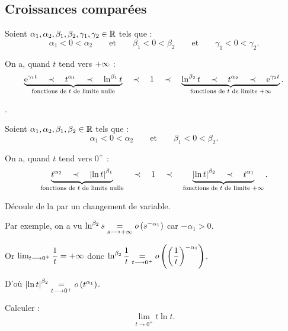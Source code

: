 \subsection{Croissances comparées}

\begin{prop}
Soient \(\alpha_1,\alpha_2,\beta_1,\beta_2,\gamma_1,\gamma_2\in\mathbb{R}\) tels que : \[\alpha_1<0<\alpha_2\qquad\text{et}\qquad\beta_1<0<\beta_2\qquad\text{et}\qquad\gamma_1<0<\gamma_2.\]

On a, quand \(t\) tend vers \(+\infty\) : \[\underbrace{\mathrm{e}^{\gamma_1t}\quad\prec\quad t^{\alpha_1}\quad\prec\quad\ln^{\beta_1}t}_{\text{fonctions de }t\text{ de limite nulle}}\quad\prec\quad1\quad\prec\quad\underbrace{\ln^{\beta_2}t\quad\prec\quad t^{\alpha_2}\quad\prec\quad\mathrm{e}^{\gamma_2t}}_{\text{fonctions de }t\text{ de limite }+\infty}.\]
\end{prop}

\begin{dem}
\Cf {}.
\end{dem}

\begin{prop}
Soient \(\alpha_1,\alpha_2,\beta_1,\beta_2\in\mathbb{R}\) tels que : \[\alpha_1<0<\alpha_2\qquad\text{et}\qquad\beta_1<0<\beta_2.\]

On a, quand \(t\) tend vers \(0^+\) : \[\underbrace{t^{\alpha_2}\quad\prec\quad\left\lvert\ln t\right\rvert^{\beta_1}}_{\text{fonctions de }t\text{ de limite nulle}}\quad\prec\quad1\quad\prec\quad\underbrace{\left\lvert\ln t\right\rvert^{\beta_2}\quad\prec\quad t^{\alpha_1}}_{\text{fonctions de }t\text{ de limite }+\infty}.\]
\end{prop}

\begin{dem}
Découle de la  par un changement de variable.

Par exemple, on a vu \(\ln^{\beta_2}s\underset{s\longrightarrow+\infty}{=}o\left(s^{-\alpha_1}\right)\) car \(-\alpha_1>0\).

Or \(\lim_{t\longrightarrow0^+}\dfrac{1}{t}=+\infty\) donc \(\ln^{\beta_2}\dfrac{1}{t}\underset{t\longrightarrow0^+}{=}o\left(\left(\dfrac{1}{t}\right)^{-\alpha_1}\right)\).

D'où \(\left\lvert\ln t\right\rvert^{\beta_2}\underset{t\longrightarrow0^+}{=}o\left(t^{\alpha_1}\right)\).
\end{dem}

\begin{exoex}
Calculer : \[\lim_{t\to0^+}t\ln t.\]
\end{exoex}

